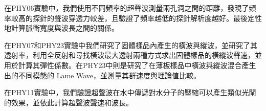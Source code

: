 \documentclass[12pt]{report}
\begin{document}
在PHY06實驗中，我們使用不同頻率的超聲波測量兩孔洞之間的距離，發現了頻率較高的探針的聲波穿透力較差，且驗證了頻率越低的探針解析度越好。最後定性地計算脈衝寬度與波長之間的關係。

在PHY07和PHY23實驗中我們研究了固體樣品內產生的橫波與縱波，並研究了其透射率，利用全反射和尋找橫波最大透射兩種方式求出固體樣品的橫縱波聲速，並用於計算其彈性係數。在PHY23中則是研究了在薄板樣品中橫波與縱波混合產生出的不同模態的 Lame Wave，並測量其群速度與理論值比較。

在PHY11實驗中，我們驗證超聲波在水中傳遞對水分子的壓縮可以產生類似光閘的效果，並依此計算超聲波聲速和波長。


\end{document}
